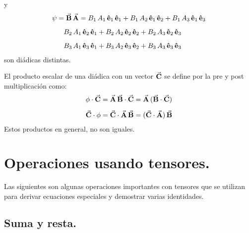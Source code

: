 \documentclass[hidelinks,12pt]{article}
\begin{document}
y
\begin{align*}
\psi &= \va{B} \, \va{A} = B_{1} \, A_{1} \, \vu{e}_{1} \, \vu{e}_{1} + B_{1} \, A_{2} \, \vu{e}_{1} \, \vu{e}_{2} + B_{1} \, A_{3} \, \vu{e}_{1} \, \vu{e}_{3} \\[0.5em]
&{\quad} B_{2} \, A_{1} \, \vu{e}_{2} \, \vu{e}_{1} + B_{2} \, A_{2} \, \vu{e}_{2} \, \vu{e}_{2} + B_{2} \, A_{3} \, \vu{e}_{2} \, \vu{e}_{3} \\[0.5em]
&{\quad} B_{3} \, A_{1} \, \vu{e}_{3} \, \vu{e}_{1} + B_{3} \, A_{2} \, \vu{e}_{3} \, \vu{e}_{2} + B_{3} \, A_{3} \, \vu{e}_{3} \, \vu{e}_{3}
\end{align*}
son diádicas distintas.
\par
El producto escalar de una diádica con un vector $\va{C}$ se define por la pre y post multiplicación como:
\begin{align*}
\phi \cdot \va{C} &= \va{A} \, \va{B} \cdot \va{C} = \va{A} \, (\va{B} \cdot \va{C}) \\[0.5em]
\va{C} \cdot \phi &= \va{C} \cdot \va{A} \, \va{B} = (\va{C} \cdot \va{A}) \, \va{B}
\end{align*}
Estos productos en general, no son iguales.

\section{Operaciones usando tensores.}

Las siguientes son algunas operaciones importantes con tensores que se utilizan para derivar ecuaciones especiales y demostrar varias identidades.

\subsection{Suma y resta.}
\end{document}
